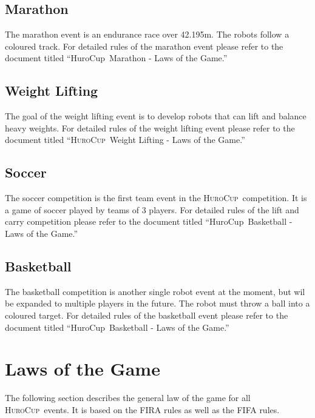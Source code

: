 \documentclass[12pt]{article}
\newcommand{\HuroCup}{\textsc{HuroCup}}
\newcounter{law}[section]
\begin{document}
\subsection{Marathon}
\label{subsec:marathon}

The marathon event is an endurance race over 42.195m. The robots
follow a coloured track. For detailed rules of the marathon event
please refer to the document titled ``HuroCup\ Marathon - Laws of the
Game.''

\subsection{Weight Lifting}
\label{subsec:weight-lifting}

The goal of the weight lifting event is to develop robots that can
lift and balance heavy weights. For detailed rules of the weight
lifting event please refer to the document titled ``\HuroCup\ Weight
Lifting - Laws of the Game.''

\subsection{Soccer}
\label{subsec:soccer}

The soccer competition is the first team event in the \HuroCup\
competition. It is a game of soccer played by teams of 3 players. For
detailed rules of the lift and carry competition please refer to the
document titled ``HuroCup\ Basketball - Laws of the Game.''

\subsection{Basketball}
\label{subsec:basketball}

The basketball competition is another single robot event at the
moment, but wil be expanded to multiple players in the future. The
robot must throw a ball into a coloured target. For detailed rules of
the basketball event please refer to the document titled ``HuroCup\
Basketball - Laws of the Game.''

\section{Laws of the Game}
\label{sec:laws}

The following section describes the general law of the game for all
\HuroCup\  events. It is based on the FIRA rules as well as the FIFA
rules. 
\end{document}
